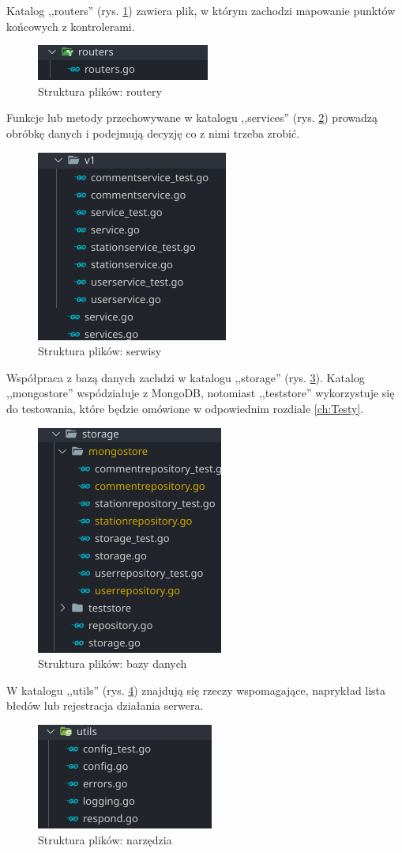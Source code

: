 Katalog ,,routers'' (rys. \ref{fig:routers}) zawiera plik, w którym zachodzi mapowanie punktów końcowych z kontrolerami.
\begin{figure}[ht]
\centering
\includegraphics[width=0.25\linewidth]{rys03/routers.png}
\caption{Struktura plików: routery}
\label{fig:routers}
\end{figure}

Funkcje lub metody przechowywane w katalogu ,,services'' (rys. \ref{fig:services}) prowadzą obróbkę danych i podejmują decyzję co z nimi trzeba zrobić.
\begin{figure}[ht]
    \centering
        \includegraphics[width=0.25\linewidth]{rys03/services.png}
        \caption{Struktura plików: serwisy}
    \label{fig:services}
\end{figure}

Współpraca z bazą danych zachdzi w katalogu ,,storage'' (rys. \ref{fig:storage}). Katalog ,,mongostore'' wspódziałuje z MongoDB, notomiast ,,teststore'' wykorzystuje się do testowania, które będzie omówione w odpowiednim rozdiale \ref{ch:Testy}.
\begin{figure}[ht]
    \centering
        \includegraphics[width=0.25\linewidth]{rys03/storage.png}
        \caption{Struktura plików: bazy danych}
    \label{fig:storage}
\end{figure}

W katalogu ,,utils'' (rys. \ref{fig:utils}) znajdują się rzeczy wspomagające, naprykład lista błedów lub rejestracja działania serwera.
\begin{figure}[ht]
    \centering
        \includegraphics[width=0.25\linewidth]{rys03/utils.png}
        \caption{Struktura plików: narzędzia}
    \label{fig:utils}
\end{figure}

